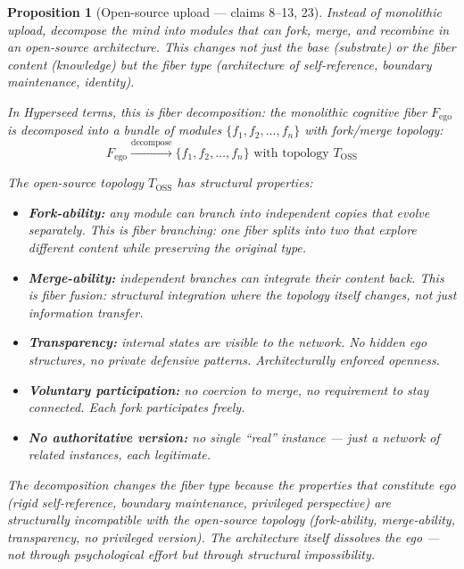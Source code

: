 \documentclass[11pt,a4paper]{article}
\newtheorem{proposition}[definition]{Proposition}
\begin{document}
\begin{proposition}[Open-source upload --- claims 8--13, 23]
\label{prop:decomposition}
Instead of monolithic upload, decompose the mind into modules that can
fork, merge, and recombine in an open-source architecture. This changes
not just the base (substrate) or the fiber content (knowledge) but the
fiber type (architecture of self-reference, boundary maintenance, identity).

In Hyperseed terms, this is \emph{fiber decomposition}: the monolithic
cognitive fiber $F_{\text{ego}}$ is decomposed into a bundle of modules
$\{f_1, f_2, \ldots, f_n\}$ with fork/merge topology:
\[
  F_{\text{ego}} \xrightarrow{\text{decompose}}
  \{f_1, f_2, \ldots, f_n\} \text{ with topology } T_{\text{OSS}}
\]

The open-source topology $T_{\text{OSS}}$ has structural properties:
\begin{itemize}
\item \textbf{Fork-ability:} any module can branch into independent copies
  that evolve separately. This is fiber branching: one fiber splits into
  two that explore different content while preserving the original type.
\item \textbf{Merge-ability:} independent branches can integrate their
  content back. This is fiber fusion: structural integration where the
  topology itself changes, not just information transfer.
\item \textbf{Transparency:} internal states are visible to the network.
  No hidden ego structures, no private defensive patterns. Architecturally
  enforced openness.
\item \textbf{Voluntary participation:} no coercion to merge, no requirement
  to stay connected. Each fork participates freely.
\item \textbf{No authoritative version:} no single ``real'' instance ---
  just a network of related instances, each legitimate.
\end{itemize}

The decomposition changes the fiber type because the properties that
constitute ego (rigid self-reference, boundary maintenance, privileged
perspective) are structurally incompatible with the open-source topology
(fork-ability, merge-ability, transparency, no privileged version).
The architecture itself dissolves the ego --- not through psychological
effort but through structural impossibility.
\end{proposition}

\end{document}
